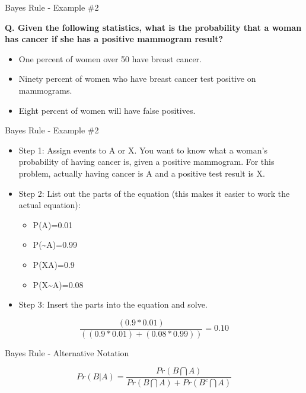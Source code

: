 \documentclass[
  ignorenonframetext,
]{beamer}
\providecommand{\tightlist}{%
  \setlength{\itemsep}{0pt}\setlength{\parskip}{0pt}}
\begin{document}
\begin{frame}{Bayes Rule - Example \#2}
\protect\hypertarget{bayes-rule---example-2}{}

\textbf{Q. Given the following statistics, what is the probability that
a woman has cancer if she has a positive mammogram result?}

\begin{itemize}
\tightlist
\item
  One percent of women over 50 have breast cancer.
\item
  Ninety percent of women who have breast cancer test positive on
  mammograms.
\item
  Eight percent of women will have false positives.
\end{itemize}

\end{frame}

\begin{frame}{Bayes Rule - Example \#2}
\protect\hypertarget{bayes-rule---example-2-1}{}

\begin{itemize}
\item
  Step 1: Assign events to A or X. You want to know what a woman's
  probability of having cancer is, given a positive mammogram. For this
  problem, actually having cancer is A and a positive test result is X.
\item
  Step 2: List out the parts of the equation (this makes it easier to
  work the actual equation):

  \begin{itemize}
  \tightlist
  \item
    P(A)=0.01
  \item
    P(\textasciitilde A)=0.99
  \item
    P(X\textbar A)=0.9
  \item
    P(X\textbar\textasciitilde A)=0.08
  \end{itemize}
\item
  Step 3: Insert the parts into the equation and solve.
\end{itemize}

\[\frac{(0.9 * 0.01)}{((0.9 * 0.01) + (0.08 * 0.99))} = 0.10\]

\end{frame}

\begin{frame}{Bayes Rule - Alternative Notation}
\protect\hypertarget{bayes-rule---alternative-notation}{}

\[Pr(B|A) = \frac{Pr(B\bigcap A)}{Pr(B \bigcap A)+ Pr(B^{c} \bigcap A)}\]

\end{frame}
\end{document}
